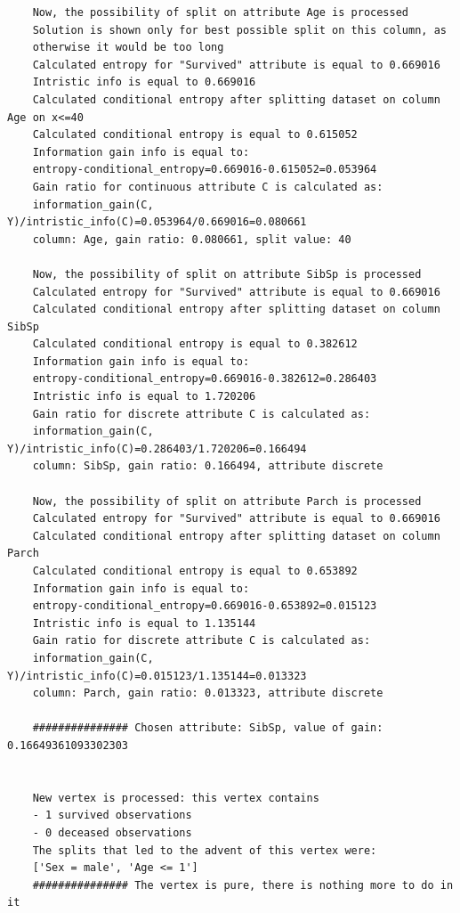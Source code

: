 \documentclass[12pt]{article}
\begin{document}
\begin{verbatim}
	Now, the possibility of split on attribute Age is processed
	Solution is shown only for best possible split on this column, as
	otherwise it would be too long
	Calculated entropy for "Survived" attribute is equal to 0.669016
	Intristic info is equal to 0.669016
	Calculated conditional entropy after splitting dataset on column Age on x<=40
	Calculated conditional entropy is equal to 0.615052
	Information gain info is equal to:
	entropy-conditional_entropy=0.669016-0.615052=0.053964
	Gain ratio for continuous attribute C is calculated as:
	information_gain(C, Y)/intristic_info(C)=0.053964/0.669016=0.080661
	column: Age, gain ratio: 0.080661, split value: 40
	
	Now, the possibility of split on attribute SibSp is processed
	Calculated entropy for "Survived" attribute is equal to 0.669016
	Calculated conditional entropy after splitting dataset on column SibSp
	Calculated conditional entropy is equal to 0.382612
	Information gain info is equal to:
	entropy-conditional_entropy=0.669016-0.382612=0.286403
	Intristic info is equal to 1.720206
	Gain ratio for discrete attribute C is calculated as:
	information_gain(C, Y)/intristic_info(C)=0.286403/1.720206=0.166494
	column: SibSp, gain ratio: 0.166494, attribute discrete
	
	Now, the possibility of split on attribute Parch is processed
	Calculated entropy for "Survived" attribute is equal to 0.669016
	Calculated conditional entropy after splitting dataset on column Parch
	Calculated conditional entropy is equal to 0.653892
	Information gain info is equal to:
	entropy-conditional_entropy=0.669016-0.653892=0.015123
	Intristic info is equal to 1.135144
	Gain ratio for discrete attribute C is calculated as:
	information_gain(C, Y)/intristic_info(C)=0.015123/1.135144=0.013323
	column: Parch, gain ratio: 0.013323, attribute discrete
	
	############### Chosen attribute: SibSp, value of gain: 0.16649361093302303
	
	
	New vertex is processed: this vertex contains
	- 1 survived observations
	- 0 deceased observations
	The splits that led to the advent of this vertex were:
	['Sex = male', 'Age <= 1']
	############### The vertex is pure, there is nothing more to do in it
\end{verbatim}
\clearpage
\end{document}
